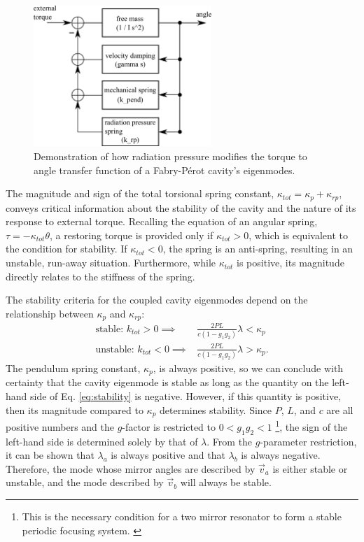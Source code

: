 \begin{figure}
\begin{centering}
\includegraphics[width=0.6\textwidth]{figures/pendulumLoop.pdf}
\caption[Controls view of addition of radiation pressure to the pendulum
transfer function]{Demonstration of how radiation pressure modifies the torque to
  angle transfer function of a Fabry-P\'{e}rot cavity's eigenmodes.}
\label{fig:pendloop}
\end{centering}
\end{figure}

The magnitude and sign of the total torsional spring constant,
$\kappa_{tot} = \kappa_p + \kappa_{rp}$, conveys critical information
about the stability of the cavity and the nature of its response to
external torque. Recalling the equation of an angular spring, $\tau =
- \kappa_{tot} \theta$, a restoring torque is provided only if
$\kappa_{tot} > 0$, which is equivalent to the condition for
stability. If $\kappa_{tot} < 0$, the spring is an anti-spring,
resulting in an unstable, run-away situation. Furthermore, 
while $\kappa_{tot}$ is positive, its magnitude directly relates to
the stiffness of the spring.

The stability criteria for the coupled cavity eigenmodes 
depend on the relationship between $\kappa_p$ and $\kappa_{rp}$:
\begin{align}
\mbox{stable: } k_{tot} > 0 \implies & \frac{2 P L}{c (1-g_1 g_2)} \lambda < \kappa_p \\
\mbox{unstable: } k_{tot} < 0 \implies & \frac{2 P L}{c (1-g_1 g_2)} \lambda > \kappa_p.
\label{eq:stability}
\end{align}
The pendulum spring constant, $\kappa_p$, is always positive, so we
can conclude with certainty that the cavity eigenmode is stable as
long as the quantity on the left-hand side of Eq. \ref{eq:stability}
is negative. However, if this quantity is positive, then its magnitude
compared to $\kappa_p$ determines stability. Since $P$, $L$, and $c$
are all positive numbers and the $g$-factor is restricted to $0 < g_1g_2
< 1$ \footnote{This is the necessary condition for a two mirror
  resonator to form a stable periodic focusing
  system. \cite[p. 747]{Siegman1986Lasers}}, the sign of the left-hand
side is determined solely by that of $\lambda$. From the $g$-parameter
restriction, it can be shown that $\lambda_a$ is always positive and
that $\lambda_b$ is always negative. Therefore, the mode whose mirror
angles are described by $\vec{v}_a$ is either stable or unstable, and
the mode described by $\vec{v}_b$ will always be stable.

